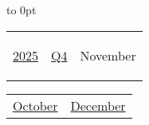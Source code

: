 \vbox to 0pt{}


\pagebreak
{\noindent\Large\renewcommand{\arraystretch}{\myNumArrayStretch}\begin{tabular}{|l|l|l}
\hyperlink{2025}{2025} & \hyperlink{Q4}{Q4} & \hypertarget{November}{November}
\end{tabular}\hfill%
\begin{tabular}{r|r@{}}
\hyperlink{October}{October} & \hyperlink{December}{December}
\end{tabular}}
\myLineThick\medskip

{%

\setlength{\tabcolsep}{\myLenTabColSep}%
%
\begin{tabularx}{\linewidth}{|l!{\vrule width \myLenLineThicknessThick}*{7}{@{}X@{}|}}
  

\end{tabularx}}
